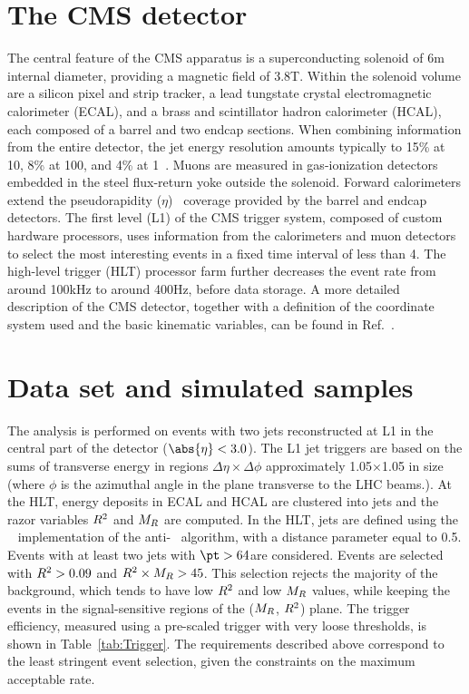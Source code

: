 \section{The CMS detector}\label{cmsdetector}

The central feature of the CMS apparatus is a superconducting solenoid
of 6\unit{m} internal diameter, providing a magnetic field of
3.8\unit{T}. Within the solenoid volume are a silicon
pixel and strip tracker, a lead tungstate crystal electromagnetic
calorimeter (ECAL), and a brass and scintillator hadron calorimeter
(HCAL), each composed of a barrel and two endcap sections.
When combining information from the entire detector, the jet energy resolution amounts typically to 15\% at 10\GeV, 8\% at 100\GeV, and 4\% at 1\TeV~\cite{Chatrchyan:2013dga}. Muons are
measured in gas-ionization detectors embedded in the steel flux-return
yoke outside the solenoid. Forward calorimeters extend the
pseudorapidity ($\eta$)~\cite{Chatrchyan:2008zzk} coverage provided by the
barrel and endcap detectors. The first level (L1) of the CMS trigger system, composed of custom
hardware processors, uses information from the calorimeters and muon
detectors to select the most interesting events in a fixed time
interval of less than 4\mus. The high-level trigger (HLT) processor
farm further decreases the event rate from around 100\unit{kHz} to
around 400\unit{Hz}, before data storage. A more
detailed description of the CMS detector, together with a definition
of the coordinate system used and the basic kinematic variables, can
be found in Ref.~\cite{Chatrchyan:2008zzk}.

\section{Data set and simulated samples}
\label{sec:sample}
The analysis is performed on events with two jets reconstructed at L1
in the central part of the detector ($\abs{\eta}< 3.0$). The L1 jet
triggers are based on the sums of
transverse energy in regions $\Delta\eta\times\Delta\phi$
approximately 1.05$\times$1.05 in
size~\cite{Chatrchyan:2008zzk} (where $\phi$ is the azimuthal angle in the plane transverse to the LHC beams.).
At the HLT, energy deposits in ECAL and HCAL are clustered into jets and the
razor variables $R^2$ and $M_R$ are computed. In the
HLT, jets are defined using the {\FASTJET}~\cite{fastjet}
implementation of the anti-\kt~\cite{antikt} algorithm, with
a distance parameter equal to 0.5. Events with at least two jets
with $\pt>64$\GeV are
considered. Events are selected with $R^2> 0.09$ and
$R^2 \times M_R > 45$\GeV. This selection
rejects the majority of the background, which tends to have low $R^2$ and low
$M_R$ values, while keeping the events in the signal-sensitive
regions of the ($M_R$, $R^2$) plane.
The trigger efficiency, measured using a pre-scaled trigger with very loose thresholds, is
shown in Table~\ref{tab:Trigger}.  The requirements described above correspond to the least stringent event selection, given the constraints on the maximum acceptable rate.

